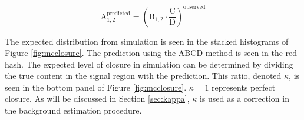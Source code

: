 \begin{equation}
\mathrm{A}_{1, 2}^{\mathrm{predicted}} = (\mathrm{B}_{1, 2} \cdot \frac{\mathrm{C}}{\mathrm{D}})^{\mathrm{observed}}
\end{equation}

The expected \ptmiss distribution from simulation is seen in the stacked histograms of Figure \ref{fig:mcclosure}. The prediction using the ABCD method is seen in the red hash. The expected level of closure in simulation can be determined by dividing the true content in the signal region with the prediction. This ratio, denoted $\kappa$, is seen in the bottom panel of Figure \ref{fig:mcclosure}. $\kappa=1$ represents perfect closure. As will be discussed in Section \ref{sec:kappa}, $\kappa$ is used as a correction in the background estimation procedure.

